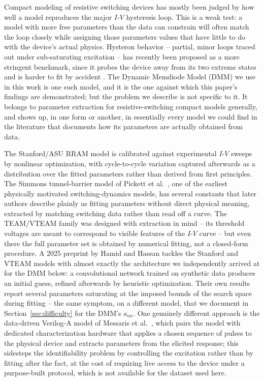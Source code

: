 \documentclass[11pt]{article}
\begin{document}
Compact modeling of resistive switching devices has mostly been judged by
how well a model reproduces the major $I$-$V$ hysteresis loop. This is a weak
test: a model with more free parameters than the data can constrain will
often match the loop closely while assigning those parameters values that
have little to do with the device's actual physics. Hysteron behavior --
partial, minor loops traced out under sub-saturating excitation -- has
recently been proposed as a more stringent benchmark, since it probes the
device away from its two extreme states and is harder to fit by accident
\cite{miranda2026hysteron}. The Dynamic Memdiode Model (DMM) we use in this
work is one such model, and it is the one against which this paper's
findings are demonstrated; but the problem we describe is not specific to
it. It belongs to parameter extraction for resistive-switching compact
models generally, and shows up, in one form or another, in essentially
every model we could find in the literature that documents how its
parameters are actually obtained from data.

The Stanford/ASU RRAM model \cite{jiang2016compact} is calibrated against
experimental $I$-$V$ sweeps by nonlinear optimization, with cycle-to-cycle
variation captured afterwards as a distribution over the fitted parameters
rather than derived from first principles. The Simmons tunnel-barrier model
of Pickett et al.\ \cite{pickett2009switching}, one of the earliest
physically motivated switching-dynamics models, has several constants that
later authors describe plainly as fitting parameters without direct physical
meaning, extracted by matching switching data rather than read off a curve.
The TEAM/VTEAM family \cite{kvatinsky2015vteam} was designed with
extraction in mind -- its threshold voltages are meant to correspond to
visible features of the $I$-$V$ curve -- but even there the full parameter
set is obtained by numerical fitting, not a closed-form procedure. A 2025
preprint by Hamid and Hassan \cite{hamid2025cnn} tackles the Stanford and
VTEAM models with almost exactly the architecture we independently arrived
at for the DMM below: a convolutional network trained on synthetic data
produces an initial guess, refined afterwards by heuristic optimization.
Their own results report several parameters saturating at the imposed bounds
of the search space during fitting -- the same symptom, on a different
model, that we document in Section~\ref{sec:difficulty} for the DMM's
$a_{on}$. One genuinely different approach is the data-driven Verilog-A
model of Messaris et al.\ \cite{messaris2018datadriven}, which pairs the
model with dedicated characterization hardware that applies a chosen
sequence of pulses to the physical device and extracts parameters from the
elicited response; this sidesteps the identifiability problem by controlling
the excitation rather than by fitting after the fact, at the cost of
requiring live access to the device under a purpose-built protocol, which is
not available for the dataset used here.
\end{document}
